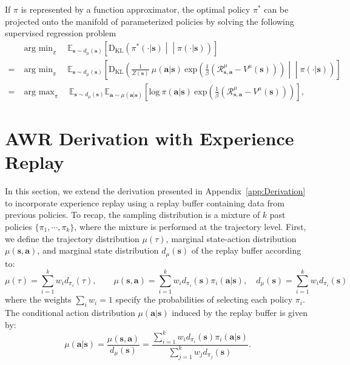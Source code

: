 \documentclass{article} \usepackage{iclr2020_conference,times}
\def\rva{{\mathbf{a}}}
\def\rvs{{\mathbf{s}}}
\newcommand{\weighti}{w_i}
\newcommand{\pii}{\pi_i}
\newcommand{\expec}{\mathbb{E}}
\begin{document}
If $\pi$ is represented by a function approximator, the optimal policy $\pi^*$ can be projected onto the manifold of parameterized policies by solving the following supervised regression problem
\begin{align}
    & \mathop{\mathrm{arg \ min}}_{\pi} \quad \mathbb{E}_{\rvs \sim d_\mu(\rvs)} \left[ \mathrm{D_{KL}} \left(\pi^*(\cdot  | \rvs) \middle|\middle| \pi(\cdot  | \rvs)\right) \right]\\
    = & \mathop{\mathrm{arg \ min}}_{\pi} \quad \mathbb{E}_{\rvs \sim d_\mu(\rvs)} \left[ \mathrm{D_{KL}} \left(\frac{1}{Z(\rvs)} \ \mu(\rva | \rvs) \ \mathrm{exp}\left(\frac{1}{\beta} \left(\mathcal{R}_{\rvs,\rva}^\mu - V^\mu(\rvs) \right) \right) \middle|\middle| \pi(\cdot | \rvs)\right) \right]\\
    = & \mathop{\mathrm{arg \ max}}_{\pi} \quad \mathbb{E}_{\rvs \sim d_\mu(\rvs)} \expec_{\rva \sim \mu(\rva | \rvs)} \left[ \mathrm{log} \ \pi (\rva | \rvs) \ \mathrm{exp}\left(\frac{1}{\beta} \left(\mathcal{R}_{\rvs,\rva}^\mu - V^\mu(\rvs) \right) \right) \right] ,
\end{align}

\section{AWR Derivation with Experience Replay}
\label{app:ReplayDerivation}
In this section, we extend the derivation presented in Appendix~\ref{app:Derivation} to incorporate experience replay using a replay buffer containing data from previous policies. To recap, the sampling distribution is a mixture of $k$ past policies $\{\pi_1, \cdots, \pi_k\}$, where the mixture is performed at the trajectory level. First, we define the trajectory distribution $\mu(\tau)$, marginal state-action distribution $\mu(\rvs, \rva)$, and marginal state distribution $d_\mu(\rvs)$ of the replay buffer according to:
\begin{equation}
    \mu(\tau) = \sum_{i=1}^k \weighti d_{\pii}(\tau), \qquad \mu(\rvs, \rva) = \sum_{i=1}^k \weighti d_{\pii}(\rvs) \pii(\rva|\rvs), \quad d_\mu(\rvs) = \sum_{i=1}^k \weighti d_{\pii}(\rvs)
    \label{app_eqn:definition}
\end{equation}
where the weights $\sum_i \weighti = 1$ specify the probabilities of selecting each policy $\pii$. The conditional action distribution $\mu(\rva|\rvs)$ induced by the replay buffer is given by:
\begin{equation}
\mu(\rva|\rvs) = \frac{\mu(\rvs, \rva)}{d_\mu(\rvs)} = \frac{\sum_{i=1}^k \weighti d_{\pii}(\rvs) \pi_i(\rva|\rvs)}{\sum_{j=1}^k w_j d_{\pi_j}(\rvs)} .
\end{equation}
\end{document}
